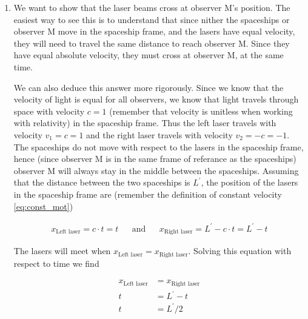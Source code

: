 \documentclass[a4paper,10pt,english]{article}
\begin{document}
\begin{enumerate}
\item We want to show that the laser beams cross at observer M's position. The easiest way to see this is to understand that since nither the spaceships or observer M move in the spaceship frame, and the lasers have equal velocity, they will need to travel the same distance to reach observer M. Since they have equal absolute velocity, they must cross at observer M, at the same time.

We can also deduce this answer more rigorously. Since we know that the velocity of light is equal for all observers, we know that light travels through space with velocity $c=1$ (remember that velocity is unitless when working with relativity) in the spaceship frame. Thus the left laser travels with velocity $v_{1}=c=1$ and the right laser travels with velocity $v_{2}=-c=-1$. The spaceships do not move with respect to the lasers in the spaceship frame, hence (since observer M is in the same frame of referance as the spaceships) observer M will always stay in the middle between the spaceships. Assuming that the distance between the two spaceships is $L^{\prime}$, the position of the lasers in the spaceship frame are (remember the definition of constant velocity \ref{eq:const_mot})

\begin{align*}
x_{\text{Left laser}}=c\cdot t=t &&\text{and}&& x_{\text{Right laser}}=L^{\prime}-c\cdot t=L^{\prime}-t
\end{align*}

The lasers will meet when $x_{\text{Left laser}}=x_{\text{Right laser}}$. Solving this equation with respect to time we find

\begin{align*}
x_{\text{Left laser}}&=x_{\text{Right laser}}\\
t&=L^{\prime}-t\\
t&=L^{\prime}/2
\end{align*}


\end{enumerate}
\end{document}
